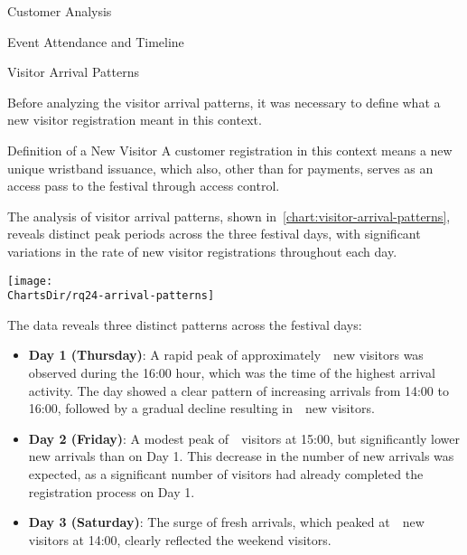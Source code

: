 \begin{section}{Customer Analysis}
\begin{subsection}{Event Attendance and Timeline}
		\begin{subsubsection}{Visitor Arrival Patterns}
			\label{subsubsec:analysis-visitor-patterns}


			Before analyzing the visitor arrival patterns, it was necessary to define what a new visitor registration meant in this context.

			\begin{infobox}{Definition of a New Visitor}
				A customer registration in this context means a new unique wristband issuance, which also, other than for payments, serves as an access pass to the festival through access control.
			\end{infobox}

			The analysis of visitor arrival patterns, shown in~\autoref{chart:visitor-arrival-patterns}, reveals distinct peak periods across the three festival days, with significant variations in the rate of new visitor registrations throughout each day.

			\begin{chart}[h]
				\centering
				\texttt{[image: \\ChartsDir/rq24-arrival-patterns]}
				\caption{ Visitor Arrival Patterns}
				\label{chart:visitor-arrival-patterns}
				\source
			\end{chart}

			The data reveals three distinct patterns across the festival days:

			\begin{itemize}
				\item \textbf{Day 1 (Thursday)}: A rapid peak of approximately~~new visitors was observed during the 16:00 hour, which was the time of the highest arrival activity.
				The day showed a clear pattern of increasing arrivals from 14:00 to 16:00, followed by a gradual decline resulting in~~new visitors.
				\item \textbf{Day 2 (Friday)}: A modest peak of~~visitors at 15:00, but significantly lower new arrivals than on Day 1.
				This decrease in the number of new arrivals was expected, as a significant number of visitors had already completed the registration process on Day 1.
				\item \textbf{Day 3 (Saturday)}: The surge of fresh arrivals, which peaked at~~new visitors at 14:00, clearly reflected the weekend visitors.
			\end{itemize}


\end{subsubsection}
\end{subsection}
\end{section}

